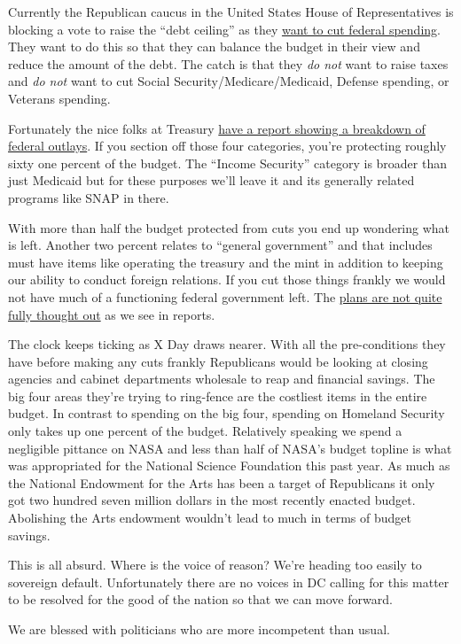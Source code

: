 Currently the Republican caucus in the United States House of
Representatives is blocking a vote to raise the ``debt ceiling'' as they
\href{https://www.msn.com/en-us/news/politics/factbox-u-s-house-republicans-many-proposals-for-spending-cuts-in-debt-ceiling-debate/ar-AA170JkU}{want
to cut federal spending}. They want to do this so that they can balance
the budget in their view and reduce the amount of the debt. The catch is
that they \emph{do not} want to raise taxes and \emph{do not} want to
cut Social Security/Medicare/Medicaid, Defense spending, or Veterans
spending.

Fortunately the nice folks at Treasury
\href{https://fiscaldata.treasury.gov/americas-finance-guide/federal-spending/\#spending-categories}{have
a report showing a breakdown of federal outlays}. If you section off
those four categories, you're protecting roughly sixty one percent of
the budget. The ``Income Security'' category is broader than just
Medicaid but for these purposes we'll leave it and its generally related
programs like SNAP in there.

With more than half the budget protected from cuts you end up wondering
what is left. Another two percent relates to ``general government'' and
that includes must have items like operating the treasury and the mint
in addition to keeping our ability to conduct foreign relations. If you
cut those things frankly we would not have much of a functioning federal
government left. The
\href{https://thehill.com/finance/3849874-here-are-the-spending-cuts-republicans-have-pitched-in-debt-limit-talks/}{plans
are not quite fully thought out} as we see in reports.

The clock keeps ticking as X Day draws nearer. With all the
pre-conditions they have before making any cuts frankly Republicans
would be looking at closing agencies and cabinet departments wholesale
to reap and financial savings. The big four areas they're trying to
ring-fence are the costliest items in the entire budget. In contrast to
spending on the big four, spending on Homeland Security only takes up
one percent of the budget. Relatively speaking we spend a negligible
pittance on NASA and less than half of NASA's budget topline is what was
appropriated for the National Science Foundation this past year. As much
as the National Endowment for the Arts has been a target of Republicans
it only got two hundred seven million dollars in the most recently
enacted budget. Abolishing the Arts endowment wouldn't lead to much in
terms of budget savings.

This is all absurd. Where is the voice of reason? We're heading too
easily to sovereign default. Unfortunately there are no voices in DC
calling for this matter to be resolved for the good of the nation so
that we can move forward.

We are blessed with politicians who are more incompetent than usual.
